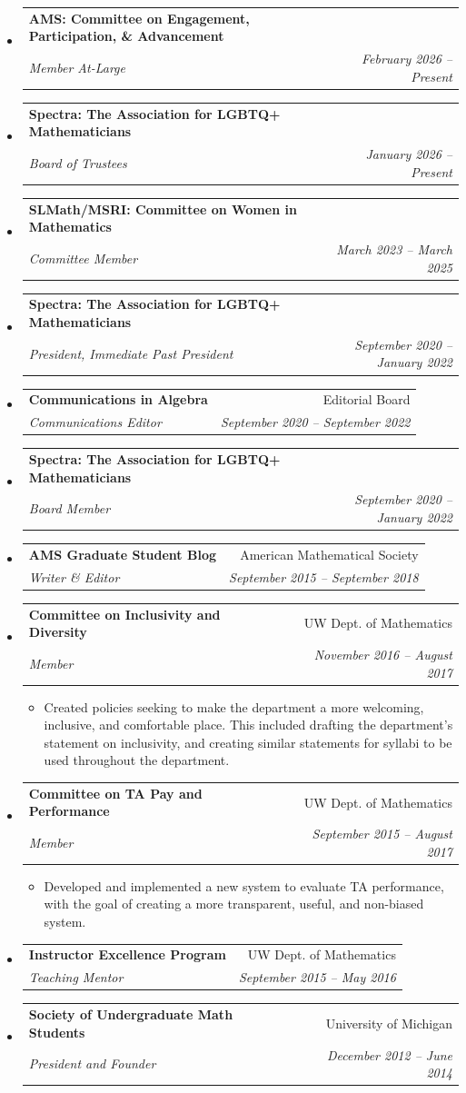\documentclass[letterpaper,11pt]{article}
\makeatletter
\newcommand{\resitem}[1]{\item #1 \vspace{-2pt}}
\newcommand{\ressubheading}[4]{
\begin{tabular*}{6.5in}[t]{l@{\cftdotfill{\cftsecdotsep}\extracolsep{\fill}}r}
		\textbf{#1} & #2 \\
		\textit{#3} & \textit{#4} \\
\end{tabular*}\vspace{-6pt}}
\makeatother
\begin{document}
\begin{itemize}
\item 
	\ressubheading{AMS: Committee on Engagement, Participation, \& Advancement}{}{Member At-Large}{February 2026 -- Present}
	
\item 
	\ressubheading{Spectra: The Association for LGBTQ+ Mathematicians }{}{Board of Trustees}{January 2026 -- Present}
		
\item 
	\ressubheading{SLMath/MSRI: Committee on Women in Mathematics }{}{Committee Member}{March 2023 -- March 2025}

\item 
	\ressubheading{Spectra: The Association for LGBTQ+ Mathematicians }{}{President, Immediate Past President}{September 2020 -- January 2022}
		
\item 
	\ressubheading{Communications in Algebra }{Editorial Board}{Communications Editor}{September 2020 -- September 2022}
	
\item 
	\ressubheading{Spectra: The Association for LGBTQ+ Mathematicians }{}{Board Member}{September 2020 -- January 2022}
	
\item 
	\ressubheading{AMS Graduate Student Blog}{American Mathematical Society}{Writer \& Editor}{September 2015 -- September 2018}
	

\item 
	\ressubheading{Committee on Inclusivity and Diversity}{UW Dept. of Mathematics}{Member}{November 2016 -- August 2017}
	\begin{itemize}
		\resitem{Created policies seeking to make the department a more welcoming, inclusive, and comfortable place. This included drafting the department's statement on inclusivity, and creating similar statements for syllabi to be used throughout the department.}
	\end{itemize}

\item 
	\ressubheading{Committee on TA Pay and Performance}{UW Dept. of Mathematics}{Member}{September 2015 -- August 2017}
	\begin{itemize}
		\resitem{Developed and implemented a new system to evaluate TA performance, with the goal of creating a more transparent, useful, and non-biased system.}
	\end{itemize}
	
\item 
	\ressubheading{Instructor Excellence Program}{UW Dept. of Mathematics}{Teaching Mentor}{September 2015 -- May 2016}

\item 
	\ressubheading{Society of Undergraduate Math Students}{University of Michigan}{President and Founder}{December 2012 -- June 2014}

\end{itemize}
\end{document}
